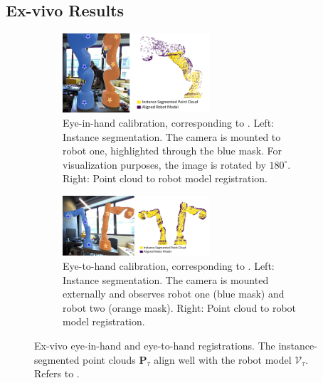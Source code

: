 \subsection{Ex-vivo Results}
\label{c1:sec:ex_vivo_results}
\begin{figure}[tb]
     \centering
     \begin{subfigure}[b]{\textwidth}
         \centering
         \includegraphics[width=0.6\textwidth]{img/visual_calibration/self_registration_combined_white.png}
         \caption{Eye-in-hand calibration, corresponding to . Left: Instance segmentation. The camera is mounted to robot one, highlighted through the blue mask. For visualization purposes, the image is rotated by $180^{\circ}$. Right: Point cloud to robot model registration.}
         \label{c1:fig:self_registration}
     \end{subfigure}
     \hfill
     \begin{subfigure}[b]{\textwidth}
         \centering
         \includegraphics[width=0.6\textwidth]{img/visual_calibration/double_registration_combined_white.png}
         \caption{Eye-to-hand calibration, corresponding to . Left: Instance segmentation. The camera is mounted externally and observes robot one (blue mask) and robot two (orange mask). Right: Point cloud to robot model registration.}
         \label{c1:fig:double_registration}
     \end{subfigure}
     \caption{Ex-vivo eye-in-hand and eye-to-hand registrations. The instance-segmented point clouds $\mathbf{P}_\tau$ align well with the robot model $\mathcal{V}_\tau$. Refers to .}
     \label{c1:fig:registration_results}
\end{figure}
